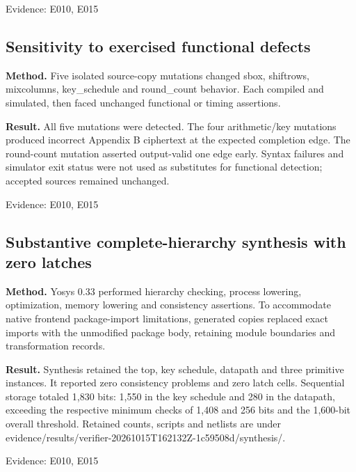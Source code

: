 \documentclass[11pt,a4paper]{article}
\begin{document}
{\small Evidence: E010,\allowbreak{} E015}

\subsection{Sensitivity to exercised functional defects}

\textbf{Method.} Five isolated source-copy mutations changed sbox,\allowbreak{} shiftrows,\allowbreak{} mixcolumns,\allowbreak{} key\_\allowbreak{}schedule and round\_\allowbreak{}count behavior. Each compiled and simulated,\allowbreak{} then faced unchanged functional or timing assertions.

\textbf{Result.} All five mutations were detected. The four arithmetic/\allowbreak{}key mutations produced incorrect Appendix B ciphertext at the expected completion edge. The round-count mutation asserted output-valid one edge early. Syntax failures and simulator exit status were not used as substitutes for functional detection; accepted sources remained unchanged.

{\small Evidence: E010,\allowbreak{} E015}

\subsection{Substantive complete-hierarchy synthesis with zero latches}

\textbf{Method.} Yosys 0.33 performed hierarchy checking,\allowbreak{} process lowering,\allowbreak{} optimization,\allowbreak{} memory lowering and consistency assertions. To accommodate native frontend package-import limitations,\allowbreak{} generated copies replaced exact imports with the unmodified package body,\allowbreak{} retaining module boundaries and transformation records.

\textbf{Result.} Synthesis retained the top,\allowbreak{} key schedule,\allowbreak{} datapath and three primitive instances. It reported zero consistency problems and zero latch cells. Sequential storage totaled 1,\allowbreak{}830 bits: 1,\allowbreak{}550 in the key schedule and 280 in the datapath,\allowbreak{} exceeding the respective minimum checks of 1,\allowbreak{}408 and 256 bits and the 1,\allowbreak{}600-bit overall threshold. Retained counts,\allowbreak{} scripts and netlists are under evidence/\allowbreak{}results/\allowbreak{}verifier-20261015T162132Z-1c59508d/\allowbreak{}synthesis/\allowbreak{}.

{\small Evidence: E010,\allowbreak{} E015}
\end{document}
